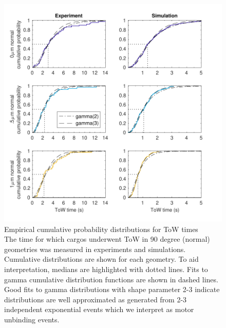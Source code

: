 \clearpage

\begin{figure}
\centering
\includegraphics[width=6in]{appendix1/ToWtime_fits.pdf}
\caption[Empirical cumulative probability distributions for ToW times]{Empirical cumulative probability distributions for ToW times \\
The time for which cargos underwent ToW in 90 degree (normal) geometries was measured in experiments and simulations. Cumulative distributions are shown for each geometry. To aid interpretation, medians are highlighted with dotted lines. Fits to gamma cumulative distribution functions are shown in dashed lines. Good fits to gamma distributions with shape parameter 2-3 indicate distributions are well approximated as generated from 2-3 independent exponential events which we interpret as motor unbinding events.
} \label{fig:ToWtimes}
\end{figure}

\clearpage

